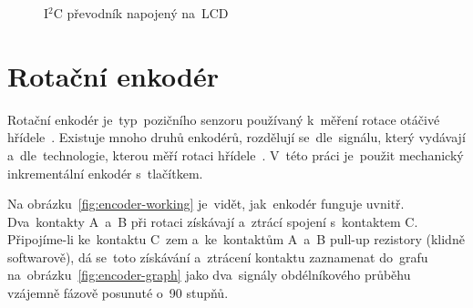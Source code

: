 \begin{figure}[htb]
\begin{minipage}{0.45\textwidth}
    \caption{\label{fig:LCD_back} I$^{2}$C převodník napojený na~LCD~\cite{laskakit-LCD}}
  \end{minipage}
\end{figure}



\section{Rotační enkodér}
Rotační enkodér je~typ~pozičního senzoru používaný k~měření rotace otáčivé hřídele~\cite{how-encoders-work}. Existuje mnoho druhů enkodérů, rozdělují se~dle~signálu, který vydávají a~dle~technologie, kterou měří rotaci hřídele~\cite{how-encoders-work}. V~této práci je~použit mechanický inkrementální enkodér s~tlačítkem.

Na obrázku~\ref{fig:encoder-working} je~vidět, jak~enkodér funguje uvnitř. Dva~kontakty A~a~B při rotaci získávají a~ztrácí spojení s~kontaktem C. Připojíme-li ke~kontaktu C~zem a~ke~kontaktům A~a~B pull-up rezistory (klidně softwarově), dá se~toto získávání a~ztrácení kontaktu zaznamenat do~grafu na~obrázku~\ref{fig:encoder-graph} jako dva~signály obdélníkového průběhu vzájemně fázově posunuté o~90 stupňů.

